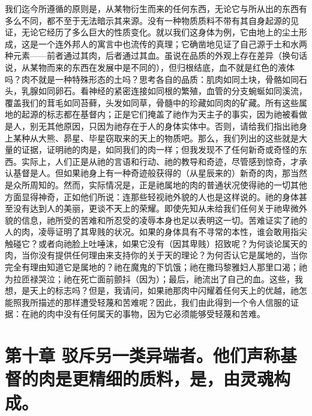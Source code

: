 我们迄今所遵循的原则是，从某物衍生而来的任何东西，无论它与所从出的东西有多么不同，都不至于无法暗示其来源。没有一种物质质料不带有其自身起源的见证，无论它经历了多么巨大的性质变化。就以我们这身体为例，它由地上的尘土形成，这是一个连外邦人的寓言中也流传的真理；它确凿地见证了自己源于土和水两种元素——前者通过其肉，后者通过其血。虽说在品质的外观上存在差异（换句话说，从某物而来的东西在发展中是不同的），但归根结底，血不就是红色的液体吗？肉不就是一种特殊形态的土吗？思考各自的品质：肌肉如同土块，骨骼如同石头，乳腺如同卵石。看神经的紧密连接如同根的繁殖，血管的分支蜿蜒如同溪流，覆盖我们的茸毛如同苔藓，头发如同草，骨髓中的珍藏如同肉的矿藏。所有这些属地的起源的标志都在基督内；正是它们掩盖了祂作为天主子的事实，因为祂被看做是人，别无其他原因，只因为祂存在于人的身体实体中。否则，请给我们指出祂身上某种从大熊、昴星、毕星窃取来的天上的物质吧。那么，我们列出的这些就是大量的证据，证明祂的肉是，如同我们的肉一样；但我发现不了任何新奇或奇怪的东西。实际上，人们正是从祂的言语和行动、祂的教导和奇迹，尽管感到惊奇，才承认基督是人。但如果祂身上有一种奇迹般获得的（从星辰来的）新奇的肉，那当然是众所周知的。然而，实际情况是，正是祂属地的肉的普通状况使得祂的一切其他方面显得神奇，正如他们所说：连那些轻视祂外貌的人也是这样说的。祂的身体甚至没有达到人的美丽，更谈不天上的荣耀。即使先知从未给我们任何关于祂卑微外貌的信息，祂所受的苦难和所忍受的凌辱本身也足以表明这一切。苦难证实了祂的人的肉，凌辱证明了其卑贱的状况。如果的身体具有不寻常的本性，谁会敢用指尖触碰它？或者向祂脸上吐唾沫，如果它没有（因其卑贱）招致呢？为何谈论属天的肉，当你没有提供任何理由来支持你的关于天的理论？为何否认它是属地的，当你完全有理由知道它是属地的？祂在魔鬼的下饥饿；祂在撒玛黎雅妇人那里口渴；祂为拉匝禄哭泣；祂在死亡面前颤抖（因为）；最后，祂流出了自己的血。这些，我想，是天上的标志吗？但是，我请问，如果祂那肉中闪耀着任何天上的优越，祂怎能照我所描述的那样遭受轻蔑和苦难呢？因此，我们由此得到一个令人信服的证据：在祂的肉中没有任何属天的事物，因为它必须能够受轻蔑和苦难。\par


\section{第十章 驳斥另一类异端者。他们声称基督的肉是更精细的质料，是，由灵魂构成。}

